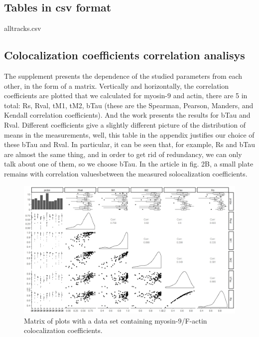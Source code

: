 \documentclass[english,authoryear]{elsarticle}
\begin{document}
\subsection*{Tables in csv format}

alltracks.csv

\subsection*{Colocalization coefficients correlation analisys}

The supplement presents the dependence of the studied parameters from each other, in the form of a matrix.
Vertically and horizontally, the correlation coefficients are plotted that we calculated for myosin-9 and actin, there are 5 in total: Rs, Rval, tM1, tM2, bTau (these are the Spearman, Pearson, Manders, and Kendall correlation coefficients).
And the work presents the results for bTau and Rval.
Different coefficients give a slightly different picture of the distribution of means in the measurements, well, this table in the appendix justifies our choice of these bTau and Rval.
In particular, it can be seen that, for example, Rs and bTau are almost the same thing, and in order to get rid of redundancy, we can only talk about one of them, so we choose bTau.
In the article in fig. 2B, a small plate remains with correlation values ​​between the measured solocalization coefficients.

\begin{figure}[h]
  \includegraphics[width=1\linewidth]{supp1.jpeg}
  \caption{Matrix of plots with a data set containing myosin-9/F-actin colocalization coefficients.}
  \label{supp1}
  \centering
\end{figure}


\end{document}
